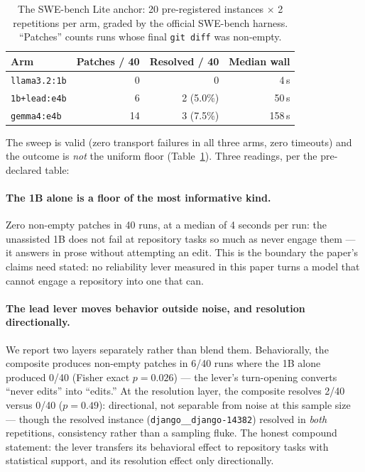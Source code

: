 \documentclass[smallcondensed,natbib]{svjour3}
\begin{document}
\begin{table}[t]
\centering\small
\caption{The SWE-bench Lite anchor: 20 pre-registered instances
$\times$ 2 repetitions per arm, graded by the official SWE-bench
harness. ``Patches'' counts runs whose final \texttt{git diff} was
non-empty.}
\label{tab:swebench}
\begin{tabular}{lrrr}
\toprule
Arm & Patches / 40 & Resolved / 40 & Median wall \\
\midrule
\texttt{llama3.2:1b} & 0 & 0 & 4\,s \\
\texttt{1b+lead:e4b} & 6 & 2 (5.0\%) & 50\,s \\
\texttt{gemma4:e4b} & 14 & 3 (7.5\%) & 158\,s \\
\bottomrule
\end{tabular}
\end{table}

The sweep is valid (zero transport failures in all three arms, zero
timeouts) and the outcome is \emph{not} the uniform floor
(Table~\ref{tab:swebench}). Three readings, per the pre-declared
table:

\paragraph{The 1B alone is a floor of the most informative kind.}
Zero non-empty patches in 40 runs, at a median of 4 seconds per run:
the unassisted 1B does not fail at repository tasks so much as never
engage them --- it answers in prose without attempting an edit. This is
the boundary the paper's claims need stated: no reliability lever
measured in this paper turns a model that cannot engage a repository
into one that can.

\paragraph{The lead lever moves behavior outside noise, and resolution
directionally.} We report two layers separately rather than blend
them. Behaviorally, the composite produces non-empty patches in 6/40
runs where the 1B alone produced 0/40 (Fisher exact $p{=}0.026$) ---
the lever's turn-opening converts ``never edits'' into ``edits.'' At
the resolution layer, the composite resolves 2/40 versus 0/40
($p{=}0.49$): directional, not separable from noise at this sample
size --- though the resolved instance
(\texttt{django\_\_django-14382}) resolved in \emph{both}
repetitions, consistency rather than a sampling fluke. The honest
compound statement: the lever transfers its behavioral effect to
repository tasks with statistical support, and its resolution effect
only directionally.
\end{document}
